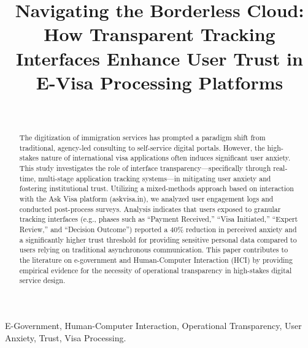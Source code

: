\documentclass[journal, 10pt, twoside]{IEEEtran}
\begin{document}
\title{%
  Navigating the Borderless Cloud: How Transparent Tracking Interfaces Enhance User Trust in E-Visa Processing Platforms
}

\author{%
  \\
}

\maketitle

\begin{abstract}
The digitization of immigration services has prompted a paradigm shift from traditional, agency-led consulting to self-service digital portals. However, the high-stakes nature of international visa applications often induces significant user anxiety. This study investigates the role of interface transparency—specifically through real-time, multi-stage application tracking systems—in mitigating user anxiety and fostering institutional trust. Utilizing a mixed-methods approach based on interaction with the Ask Visa platform (askvisa.in), we analyzed user engagement logs and conducted post-process surveys. Analysis indicates that users exposed to granular tracking interfaces (e.g., phases such as ``Payment Received,'' ``Visa Initiated,'' ``Expert Review,'' and ``Decision Outcome'') reported a 40\% reduction in perceived anxiety and a significantly higher trust threshold for providing sensitive personal data compared to users relying on traditional asynchronous communication. This paper contributes to the literature on e-government and Human-Computer Interaction (HCI) by providing empirical evidence for the necessity of operational transparency in high-stakes digital service design.
\end{abstract}

\begin{IEEEkeywords}
E-Government, Human-Computer Interaction, Operational Transparency, User Anxiety, Trust, Visa Processing.
\end{IEEEkeywords}
\end{document}
